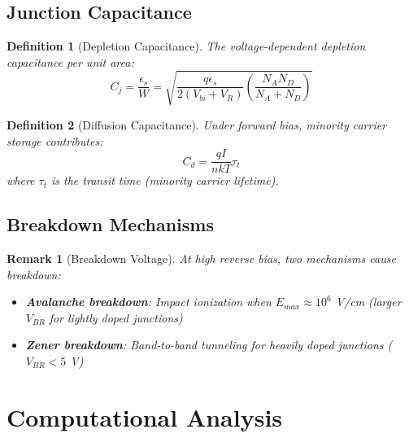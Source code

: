 \documentclass[a4paper, 11pt]{article}
\newtheorem{definition}{Definition}[section]
\newtheorem{remark}{Remark}[section]
\begin{document}
\subsection{Junction Capacitance}

\begin{definition}[Depletion Capacitance]
The voltage-dependent depletion capacitance per unit area:
\begin{equation}
C_j = \frac{\epsilon_s}{W} = \sqrt{\frac{q\epsilon_s}{2(V_{bi} + V_R)}\left(\frac{N_A N_D}{N_A + N_D}\right)}
\end{equation}
\end{definition}

\begin{definition}[Diffusion Capacitance]
Under forward bias, minority carrier storage contributes:
\begin{equation}
C_d = \frac{qI}{nkT}\tau_t
\end{equation}
where $\tau_t$ is the transit time (minority carrier lifetime).
\end{definition}

\subsection{Breakdown Mechanisms}

\begin{remark}[Breakdown Voltage]
At high reverse bias, two mechanisms cause breakdown:
\begin{itemize}
\item \textbf{Avalanche breakdown}: Impact ionization when $E_{max} \approx 10^6$ V/cm (larger $V_{BR}$ for lightly doped junctions)
\item \textbf{Zener breakdown}: Band-to-band tunneling for heavily doped junctions ($V_{BR} < 5$ V)
\end{itemize}
\end{remark}

\section{Computational Analysis}
\end{document}
